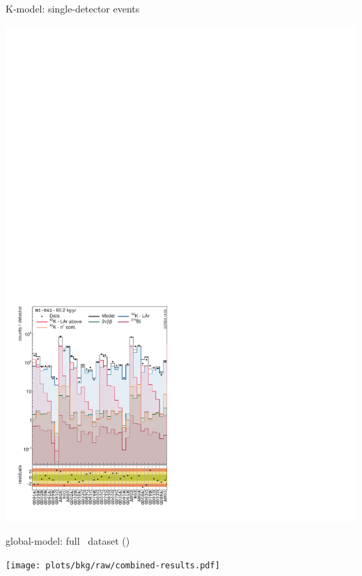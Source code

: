 \documentclass[10pt,aspectratio=169]{beamer}
\begin{document}
\begin{frame}{K-model: single-detector events}
\begin{center}
    \includegraphics[height=0.85\textheight]{plots/bkg/raw/ph2/results/kmodel/kmodel-1d-ds1.pdf}
  \end{center}
\end{frame}
\begin{frame}[plain]{global-model: full \phasetwo\ dataset (\gexpobkg)}
  \begin{center}
    \texttt{[image: plots/bkg/raw/combined-results.pdf]}
  \end{center}
\end{frame}
\end{document}
